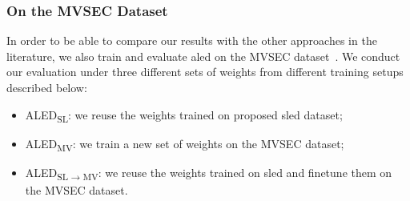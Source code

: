 \subsubsection{On the MVSEC Dataset}

In order to be able to compare our results with the other approaches in the literature, we also train and evaluate \acrshort{aled} on the MVSEC dataset~\cite{Zhu2018TheMS}. We conduct our evaluation under three different sets of weights from different training setups described below:
\begin{itemize}
  \item ALED\textsubscript{SL}: we reuse the weights trained on proposed \acrshort{sled} dataset;
  \item ALED\textsubscript{MV}: we train a new set of weights on the MVSEC dataset;
  \item ALED\textsubscript{SL\(\rightarrow\)MV}: we reuse the weights trained on \acrshort{sled} and finetune them on the MVSEC dataset.
\end{itemize}

